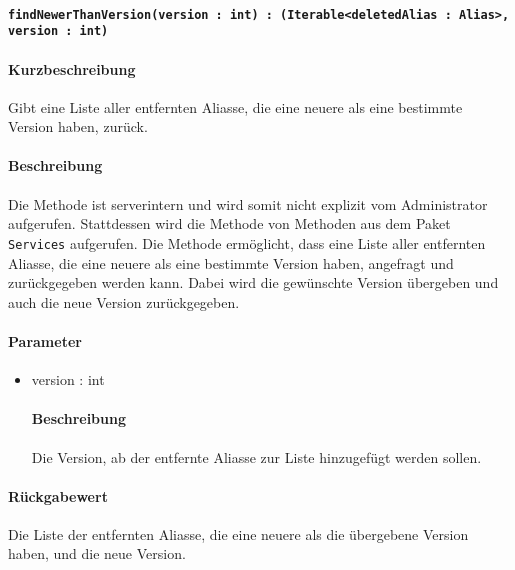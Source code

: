 \paragraph{\texttt{findNewerThanVersion(version : int) : (Iterable<deletedAlias : Alias>, version : int)}}%
\paragraph*{Kurzbeschreibung}
Gibt eine Liste aller entfernten Aliasse, die eine neuere als eine bestimmte Version haben, zurück.
\paragraph*{Beschreibung}
Die Methode ist serverintern und wird somit nicht explizit vom Administrator aufgerufen.
Stattdessen wird die Methode von Methoden aus dem Paket \texttt{Services} aufgerufen.
Die Methode ermöglicht, dass eine Liste aller entfernten Aliasse, die eine neuere als eine bestimmte Version haben, angefragt und zurückgegeben werden kann.
Dabei wird die gewünschte Version übergeben und auch die neue Version zurückgegeben.
\paragraph*{Parameter}
\begin{itemize}
    \item version : int
    		\paragraph*{Beschreibung}
    		Die Version, ab der entfernte Aliasse zur Liste hinzugefügt werden sollen.
\end{itemize}
\paragraph*{Rückgabewert}
Die Liste der entfernten Aliasse, die eine neuere als die übergebene Version haben, und die neue Version.
